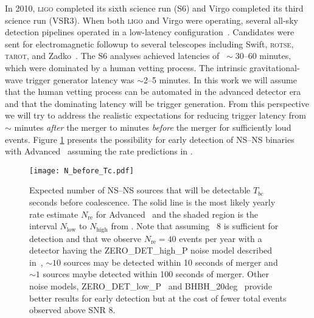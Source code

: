 In 2010, \textsc{ligo} completed its sixth science run (S6) and Virgo
completed its third science run (VSR3). When both \textsc{ligo} and Virgo were
operating, several all-sky detection pipelines operated in a low-latency
configuration~\cite{HugheyGWPAW2011, S6lowlatency}. Candidates were sent for
electromagnetic followup to several telescopes including Swift,
\textsc{rotse}, \textsc{tarot}, and Zadko~\cite{kanner2008, HugheyGWPAW2011}.
The S6 analyses achieved latencies of $~\sim30$--$60$ minutes, which were
dominated by a human vetting process. The intrinsic gravitational-wave trigger
generator latency was $\sim$2--5 minutes.  In this work we will assume that
the human vetting process can be automated in the advanced detector era and
that the dominating latency will be trigger generation. From this perspective
we will try to address the realistic expectations for reducing trigger latency
from $\sim$ minutes \emph{after} the merger to minutes \emph{before} the
merger for sufficiently loud events.  Figure \ref{fig:earlywarning} presents
the possibility for early detection of NS--NS binaries with Advanced \LIGO\
assuming the rate predictions in \cite{Abadie:2010p10836}.
%
\begin{figure}
\texttt{[image: N\_before\_Tc.pdf]}
\caption{\label{fig:earlywarning} Expected number of NS--NS sources that will
be detectable $T_{bc}$ seconds before coalescence.  The solid line is the most
likely yearly rate estimate $N_{\mathrm{re}}$ for Advanced \LIGO\ and the
shaded region is the interval $N_{\mathrm{low}}$ to $N_{\mathrm{high}}$ from
\cite{Abadie:2010p10836}.  Note that assuming \SNR\ 8 is sufficient for
detection and that we observe $N_{\mathrm{re}} = 40$ events per year with a
detector having the ZERO\_DET\_high\_P noise model described
in~\cite{ALIGONoiseZERO_DET_high_P}, $\sim10$ sources may be detected within 10
seconds of merger and $\sim1$ sources maybe detected within 100 seconds of
merger.  Other noise models, ZERO\_DET\_low\_P~\cite{ALIGONoiseZERO_DET_low_P}
and BHBH\_20deg~\cite{ALIGONoiseBHBH_20deg} provide better results for early
detection but at the cost of fewer total events observed above SNR 8.}
\end{figure}


